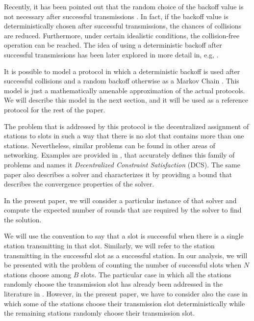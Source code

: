 \documentclass[journal]{IEEEtran}
\begin{document}
Recently, it has been pointed out that the random choice of the backoff value is not necessary after successful transmissions \cite{barcelo2008lba}.
In fact, if the backoff value is deterministically chosen after successful transmissions, the chances of collisions are reduced.
Furthermore, under certain idealistic conditions, the collision-free operation can be reached.
The idea of using a deterministic backoff after successful transmissions has been later explored in more detail in, e.g, \cite{he2009srb,barcelo2011tcf,fang2011dlm}.

It is possible to model a protocol in which a deterministic backoff is used after successful collisions and a random backoff otherwise as a Markov Chain \cite{he2009srb, barcelo2010fcc}.
This model is just a mathematically amenable approximation of the actual protocols.
We will describe this model in the next section, and it will be used as a reference protocol for the rest of the paper.

The problem that is addressed by this protocol is the decentralized assignment of stations to slots in such a way that there is no slot that contains more than one stations.
Nevertheless, similar problems can be found in other areas of networking.
Examples are provided in \cite{duffy2011dcs}, that accurately defines this family of problems and names it \emph{Decentralized Constraint Satisfaction} (DCS).
The same paper also describes a solver and characterizes it by providing a bound that describes the convergence properties of the solver.

In the present paper, we will consider a particular instance of that solver and compute the expected number of rounds that are required by the solver to find the solution.

We will use the convention to say that a slot is successful when there is a single station transmitting in that slot.
Similarly, we will refer to the station transmitting in the successful slot as a successful station.
In our analysis, we will be presented with the problem of counting the number of successful slots when $N$ stations choose among $B$ slots.
The particular case in which all the stations randomly choose the transmission slot has already been addressed in the literature in \cite{szpankowski1983asc}.
However, in the present paper, we have to consider also the case in which some of the stations choose their transmission slot deterministically while the remaining stations randomly choose their transmission slot.
\end{document}
